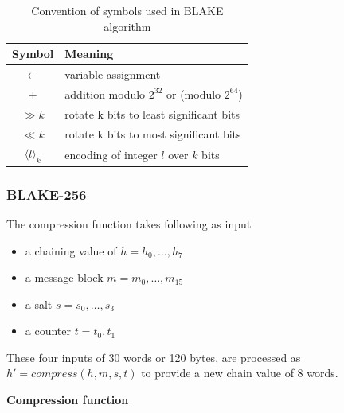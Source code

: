 \documentclass[12pt]{artikel3}                  %
\begin{document}
\begin{table}[h]
  \begin{center}
    \begin{tabular}{ c l } \hline
      Symbol                 & Meaning \\ \hline
      $\gets$                    & variable assignment \\
      $+$                    & addition modulo $2^{32}$ or (modulo $2^{64}$) \\
      $\gg k$                  & rotate k bits to least significant bits \\
      $\ll k$                  & rotate k bits to most significant bits \\
      $\langle l \rangle_{k}$ & encoding of integer $l$ over $k$ bits \\ \hline
    \end{tabular}
    \caption{Convention of symbols used in BLAKE algorithm}
  \end{center}
\end{table}

\subsubsection{ BLAKE-256 }

The compression function takes following as input
\begin{itemize}
  \item a chaining value of $h = h_{0},\dots, h_{7}$
  \item a message block $m = m_{0},\dots, m_{15}$
  \item a salt $s = s_{0},\dots, s_{3}$
  \item a counter $t = t_{0}, t_{1}$
\end{itemize}
These four inputs of 30 words or 120 bytes, are processed as $h' = compress(h, m, s, t)$ to provide a new
chain value of 8 words.

{\bf Compression function}
\end{document}
